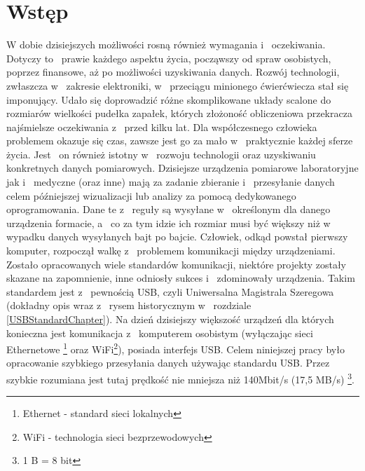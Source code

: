 \documentclass{BscUS}
\newcommand\blankpage{%
    \null
    \thispagestyle{empty}%
    \newpage}
\begin{document}
\clearpage
\tableofcontents
\afterpage{\blankpage}


\chapter{Wstęp}
\label{beginChapter}
\pagestyle{fancy}
W dobie dzisiejszych możliwości rosną również wymagania i~ oczekiwania. Dotyczy to~ prawie każdego aspektu życia, począwszy od spraw osobistych, poprzez finansowe, aż po możliwości uzyskiwania danych. Rozwój technologii, zwłaszcza w~ zakresie elektroniki, w~ przeciągu minionego ćwierćwiecza stał się imponujący. Udało się doprowadzić różne skomplikowane układy scalone do~ rozmiarów wielkości pudełka zapałek, których złożoność obliczeniowa przekracza najśmielsze oczekiwania z~ przed kilku lat. Dla współczesnego człowieka problemem okazuje się czas, zawsze jest go za mało w~ praktycznie każdej sferze życia. Jest~ on również istotny w~ rozwoju technologii oraz uzyskiwaniu konkretnych danych pomiarowych.
\newline
\indent Dzisiejsze urządzenia pomiarowe laboratoryjne jak i~ medyczne (oraz inne) mają za zadanie zbieranie i~ przesyłanie danych celem późniejszej wizualizacji lub analizy za pomocą dedykowanego oprogramowania. Dane te z~ reguły są wysyłane w~ określonym dla danego urządzenia formacie, a~ co za tym idzie ich rozmiar musi być większy niż w~ wypadku danych wysyłanych bajt po bajcie.
\newline
\indent Człowiek, odkąd powstał pierwszy komputer, rozpoczął walkę z~ problemem komunikacji między urządzeniami. Zostało opracowanych wiele standardów komunikacji, niektóre projekty zostały skazane na zapomnienie, inne odniosły sukces i~ zdominowały urządzenia. Takim standardem jest z~ pewnością USB, czyli Uniwersalna Magistrala Szeregowa (dokładny opis wraz z~ rysem historycznym w~ rozdziale \ref{USBStandardChapter}). Na dzień dzisiejszy większość urządzeń dla których konieczna jest komunikacja z~ komputerem osobistym (wyłączając sieci Ethernetowe \footnote{Ethernet - standard sieci lokalnych} oraz WiFi\footnote{WiFi - technologia sieci bezprzewodowych}), posiada interfejs USB.
\newline
\indent Celem niniejszej pracy było opracowanie szybkiego przesyłania danych używając standardu USB. Przez szybkie rozumiana jest tutaj prędkość nie mniejsza niż 140Mbit/s (17,5 MB/s) \footnote{1 B = 8 bit}.
\end{document}
